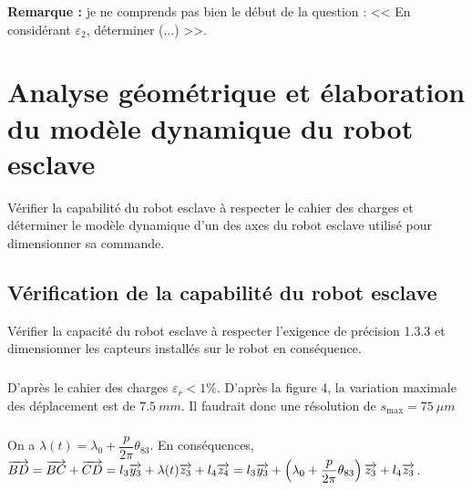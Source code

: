 \documentclass[10pt,fleqn]{article} %
\begin{document}

\textbf{Remarque :} je ne comprends pas bien le début de la question : << En considérant $\varepsilon_2$, déterminer (...) >>.


\section{Analyse géométrique et élaboration du modèle dynamique du robot esclave}

\begin{obj}
Vérifier la capabilité du robot esclave à respecter le cahier des charges et déterminer le modèle dynamique
d’un des axes du robot esclave utilisé pour dimensionner sa commande.
\end{obj}

\subsection{Vérification de la capabilité du robot esclave}
\begin{obj}
Vérifier la capacité du robot esclave à respecter l’exigence de précision 1.3.3 et dimensionner les
capteurs installés sur le robot en conséquence.
\end{obj}


\subparagraph{}%

D'après le cahier des charges $\varepsilon_r<1\%$. 
D'après la figure 4, la variation maximale des déplacement est de $\SI{7,5}{mm}$. Il faudrait donc une résolution de $s_{\text{max}}=\SI{75}{\mu m}$



\subparagraph{}%
On a $\lambda(t)=\lambda_0 + \dfrac{p}{2\pi} \theta_{83}$. 
En conséquences, $\overrightarrow{BD}=\overrightarrow{BC}+\overrightarrow{CD}=l_3\overrightarrow{y_3}+\lambda(t)\overrightarrow{z_3}+l_4\overrightarrow{z_4}
=l_3\overrightarrow{y_3}+\left( \lambda_0 + \dfrac{p}{2\pi} \theta_{83} \right)\overrightarrow{z_3}+l_4\overrightarrow{z_3}$.


\subparagraph{}%
\end{document}
